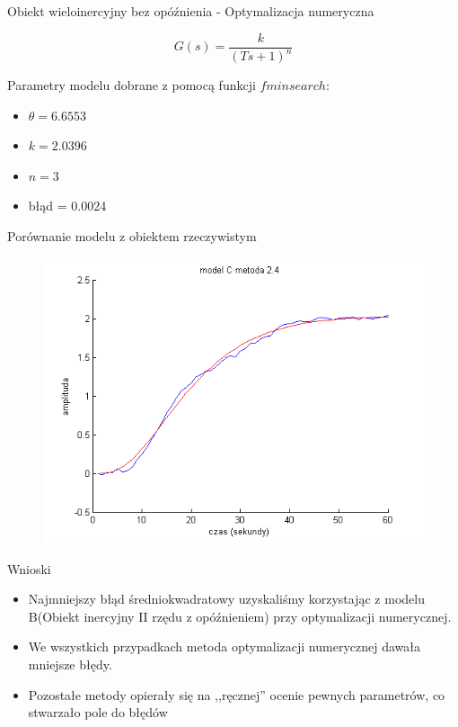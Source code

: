 \documentclass{beamer}
\begin{document}
\begin{frame}{Obiekt wieloinercyjny bez opóźnienia - Optymalizacja numeryczna }

\begin{equation*}
G(s) = \frac{k }{(T s + 1)^n}
\end{equation*}

Parametry modelu dobrane z pomocą funkcji $fminsearch$:

\begin{itemize}
\item $\theta =  6.6553$
\item $k =   2.0396$
\item $n = 3$
\item błąd =  0.0024
\end{itemize}

\end{frame}


\begin{frame}{Porównanie modelu z obiektem rzeczywistym}

\begin{figure}
\includegraphics[width = \linewidth]{C_2_4}
\end{figure}

\end{frame}

\begin{frame}{Wnioski}

\begin{itemize}
\item Najmniejszy błąd średniokwadratowy uzyskaliśmy korzystając z modelu B(Obiekt inercyjny II rzędu z opóźnieniem) przy optymalizacji numerycznej. 
\item We wszystkich przypadkach metoda optymalizacji numerycznej dawała mniejsze błędy. 
\item Pozostałe metody opierały się na ,,ręcznej'' ocenie pewnych parametrów, co stwarzało pole do błędów
\end{itemize}


\end{frame}
\end{document}
